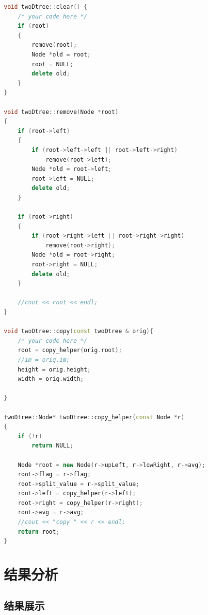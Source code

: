 \documentclass[UTF8]{ctexart}
\begin{document}
\begin{lstlisting}[language=C++,caption={twoDTree.cpp},label={twoDTree.cpp}]
void twoDtree::clear() {
	/* your code here */
    if (root)
    {
        remove(root);
        Node *old = root;
        root = NULL;
        delete old;
    }
}

void twoDtree::remove(Node *root)
{
    if (root->left)
    {
        if (root->left->left || root->left->right)
            remove(root->left);
        Node *old = root->left;
        root->left = NULL;
        delete old;
    }
    
    if (root->right)
    {
        if (root->right->left || root->right->right)
            remove(root->right);
        Node *old = root->right;
        root->right = NULL;
        delete old;
    }

    //cout << root << endl;
}

void twoDtree::copy(const twoDtree & orig){
	/* your code here */
    root = copy_helper(orig.root);
    //im = orig.im;
    height = orig.height;
    width = orig.width;

}

twoDtree::Node* twoDtree::copy_helper(const Node *r)
{
    if (!r)
        return NULL;
    
    Node *root = new Node(r->upLeft, r->lowRight, r->avg);
    root->flag = r->flag;
    root->split_value = r->split_value;
    root->left = copy_helper(r->left);
    root->right = copy_helper(r->right);
    root->avg = r->avg;
    //cout << "copy " << r << endl;
    return root;
}


\end{lstlisting}
	\section{结果分析}
	\subsection{结果展示}
\end{document}
